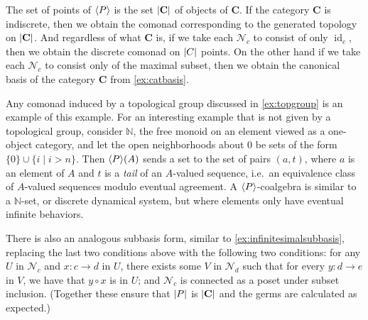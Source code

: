 \documentclass[11pt, oneside, article]{memoir}
\theoremstyle{plain}
\theoremstyle{definition}
\theoremstyle{remark}
\newenvironment{example}
{\renewcommand\qedsymbol{$\lrcorner$}%
  \pushQED{\qed}\myexample}
{\popQED\endmyexample}
\DeclareMathOperator{\id}{id}
\DeclarePairedDelimiter{\gen}{\langle}{\rangle}
\DeclarePairedDelimiter{\abs}{\lvert}{\rvert}
\newcommand{\namedcat}[1]{\mathbf{#1}}
\newcommand{\cat}[1]{\mathbf{#1}}
\newcommand{\Set}{\namedcat{Set}}
\newcommand{\pts}[1]{{\abs{#1}}}
\newcommand{\obs}[1]{\pts{#1}}
\newcommand{\ph}[1]{#1}
\newcommand{\setof}[1]{\{#1\}}
\newcommand{\xA}{A}
\newcommand{\bB}{\cat{B}}
\newcommand{\bC}{\cat{C}}
\newcommand{\pP}{\ph{P}}
\newcommand{\cP}{\gen{\pP}}
\newcommand{\neighbors}[1]{\mathcal{N}_{#1}}
\newcommand{\nn}{\mathbb{N}}
\begin{document}
\begin{example}[Infinitesimal categories]
  The set of points of $\cP$ is the set $\obs{\bC}$ of objects of
  $\bC$. If the category $\bC$ is indiscrete, then we obtain the
  comonad corresponding to the generated topology on $\pts{\bC}$. And
  regardless of what $\bC$ is, if we take each $\neighbors{c}$ to
  consist of only $\id_c$, then we obtain the discrete comonad on
  $\pts{C}$ points. On the other hand if we take each $\neighbors{c}$
  to consist only of the maximal subset, then we obtain the canonical
  basis of the category $\bC$ from \cref{ex:catbasis}.

  Any comonad induced by a topological group discussed in
  \cref{ex:topgroup} is an example of this example. For an interesting
  example that is not given by a topological group, consider $\nn$,
  the free monoid on an element viewed as a one-object category, and
  let the open neighborhoods about $0$ be sets of the form
  $\setof{0} \cup \setof{i \mid i > n}$. Then $\cP(\xA)$ sends a set
  to the set of pairs $(a, t)$, where $a$ is an element of $\xA$ and
  $t$ is a \emph{tail} of an $\xA$-valued sequence, i.e.\ an
  equivalence class of $\xA$-valued sequences modulo eventual
  agreement. A $\cP$-coalgebra is similar to a $\nn$-set, or discrete
  dynamical system, but where elements only have eventual infinite
  behaviors.

  There is also an analogous subbasis form, similar to
  \cref{ex:infinitesimalsubbasis}, replacing the last two conditions
  above with the following two conditions: for any $U$ in
  $\neighbors{c}$ and $x \colon c \to d$ in $U$, there exists some $V$
  in $\neighbors{d}$ such that for every $y \colon d \to e$ in $V$, we
  have that $y \circ x$ is in $U$; and $\neighbors{c}$ is connected as
  a poset under subset inclusion. (Together these ensure that
  $\pts{\pP}$ is $\obs{\bC}$ and the germs are calculated as
  expected.)
\end{example}

  
  
\end{document}
